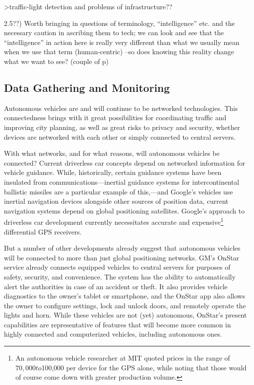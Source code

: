 >traffic-light detection and problems of infrastructure??


2.5??) Worth bringing in questions of terminology, ``intelligence''
etc. and the necessary caution in ascribing them to tech; we can look
and see that the ``intelligence'' in action here is really very
different than what we usually mean when we use that term
(human-centric)
--so does knowing this reality change what we want to see? (couple of
p)


\subsection{Data Gathering and Monitoring} 



Autonomous vehicles are and will continue to be networked
technologies. This connectedness brings with it great possibilities
for coordinating traffic and improving city planning, as well as great
risks to privacy and security, whether devices are networked with each
other or simply connected to central servers. 

With what networks, and for what reasons, will autonomous vehicles be
connected? Current driverless car concepts depend on networked
information for vehicle guidance. While, historically, certain
guidance systems have been insulated from communications---inertial
guidance systems for intercontinental ballistic
missiles are a particular example of this,\cite{mackenzie}---and
Google's vehicles use inertial navigation devices\cite{knightfurther}
alongside other sources of position data, current navigation systems
depend on global positioning satellites. Google's approach to
driverless car development currently necessitates accurate
and expensive\footnote{An autonomous vehicle researcher at MIT
  quoted prices in the range of $70,000 to $100,000 per device for the
GPS alone, while noting that those would of course come down with
greater production volume.} differential GPS receivers.

But a number of other developments already suggest that autonomous
vehicles will be connected to more than just global positioning
networks. GM's OnStar service already connects equipped vehicles to central servers for
purposes of safety, security, and convenience. The system has the
ability to automatically alert the authorities in case of an accident
or theft. It also provides vehicle diagnostics to the owner's tablet
or smartphone, and the OnStar app also allows the owner to configure settings, lock and
unlock doors, and remotely operate the lights and horn.\cite{onstar}
While these vehicles are not (yet) autonomous, OnStar's present
capabilities are representative of features that will become more common in highly
connected and computerized vehicles, including autonomous ones.

